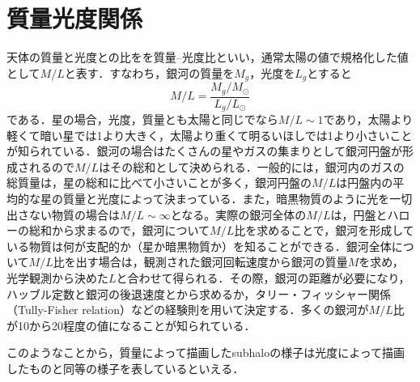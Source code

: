 \section{質量光度関係}

天体の質量と光度との比をを質量--光度比といい，通常太陽の値で規格化した値として$M/L$と表す．すなわち，銀河の質量を$M_g$，光度を$L_g$とすると
\begin{equation}
	M/L = \frac{M_g/M_\odot}{L_g/L_\odot}
\end{equation}
である．星の場合，光度，質量とも太陽と同じでなら$M/L \sim 1$であり，太陽より軽くて暗い星では1より大きく，太陽より重くて明るいほしでは1より小さいことが知られている．銀河の場合はたくさんの星やガスの集まりとして銀河円盤が形成されるので$M/L$はその総和として決められる．一般的には，銀河内のガスの総質量は，星の総和に比べて小さいことが多く，銀河円盤の$M/L$は円盤内の平均的な星の質量と光度によって決まっている．また，暗黒物質のように光を一切出さない物質の場合は$M/L \sim \infty$となる。実際の銀河全体の$M/L$は，円盤とハローの総和から求まるので，銀河について$M/L$比を求めることで，銀河を形成している物質は何が支配的か（星か暗黒物質か）を知ることができる．銀河全体について$M/L$比を出す場合は，観測された銀河回転速度から銀河の質量$M$を求め，光学観測から決めた$L$と合わせて得られる．その際，銀河の距離が必要になり，ハッブル定数と銀河の後退速度とから求めるか，タリー・フィッシャー関係（Tully-Fisher relation）などの経験則を用いて決定する．多くの銀河が$M/L$比が10から20程度の値になることが知られている．

%
%
%
%
%

このようなことから，質量によって描画したsubhaloの様子は光度によって描画したものと同等の様子を表しているといえる．